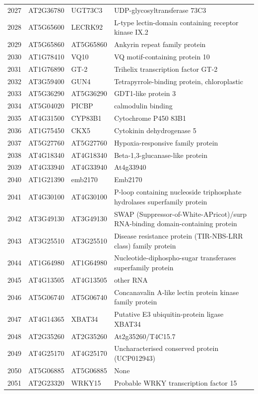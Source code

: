 \documentclass[11pt]{article}
\begin{document}
\begin{center}
\begin{tabular}{rlll}
2027 & AT2G36780 & UGT73C3 & UDP-glycosyltransferase 73C3\\
2028 & AT5G65600 & LECRK92 & L-type lectin-domain containing receptor kinase IX.2\\
2029 & AT5G65860 & AT5G65860 & Ankyrin repeat family protein\\
2030 & AT1G78410 & VQ10 & VQ motif-containing protein 10\\
2031 & AT1G76890 & GT-2 & Trihelix transcription factor GT-2\\
2032 & AT3G59400 & GUN4 & Tetrapyrrole-binding protein, chloroplastic\\
2033 & AT5G36290 & AT5G36290 & GDT1-like protein 3\\
2034 & AT5G04020 & PICBP & calmodulin binding\\
2035 & AT4G31500 & CYP83B1 & Cytochrome P450 83B1\\
2036 & AT1G75450 & CKX5 & Cytokinin dehydrogenase 5\\
2037 & AT5G27760 & AT5G27760 & Hypoxia-responsive family protein\\
2038 & AT4G18340 & AT4G18340 & Beta-1,3-glucanase-like protein\\
2039 & AT4G33940 & AT4G33940 & At4g33940\\
2040 & AT1G21390 & emb2170 & Emb2170\\
2041 & AT4G30100 & AT4G30100 & P-loop containing nucleoside triphosphate hydrolases superfamily protein\\
2042 & AT3G49130 & AT3G49130 & SWAP (Suppressor-of-White-APricot)/surp RNA-binding domain-containing protein\\
2043 & AT3G25510 & AT3G25510 & Disease resistance protein (TIR-NBS-LRR class) family protein\\
2044 & AT1G64980 & AT1G64980 & Nucleotide-diphospho-sugar transferases superfamily protein\\
2045 & AT4G13505 & AT4G13505 & other RNA\\
2046 & AT5G06740 & AT5G06740 & Concanavalin A-like lectin protein kinase family protein\\
2047 & AT4G14365 & XBAT34 & Putative E3 ubiquitin-protein ligase XBAT34\\
2048 & AT2G35260 & AT2G35260 & At2g35260/T4C15.7\\
2049 & AT4G25170 & AT4G25170 & Uncharacterised conserved protein (UCP012943)\\
2050 & AT5G06885 & AT5G06885 & None\\
2051 & AT2G23320 & WRKY15 & Probable WRKY transcription factor 15\\

\end{tabular}
\end{center}
\end{document}
